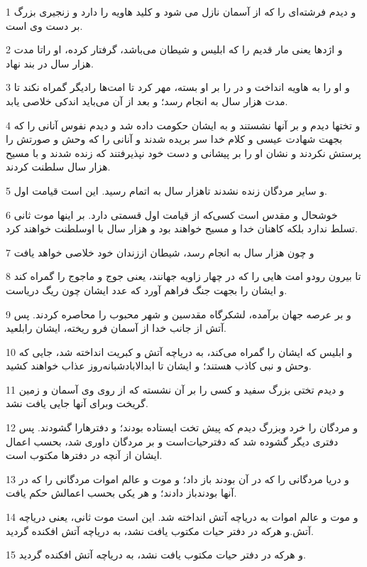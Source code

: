 \par 1 و دیدم فرشته‌ای را که از آسمان نازل می شود و کلید هاویه را دارد و زنجیری بزرگ بر دست وی است.
\par 2 و اژدها یعنی مار قدیم را که ابلیس و شیطان می‌باشد، گرفتار کرده، او راتا مدت هزار سال در بند نهاد.
\par 3 و او را به هاویه انداخت و در را بر او بسته، مهر کرد تا امت‌ها رادیگر گمراه نکند تا مدت هزار سال به انجام رسد؛ و بعد از آن می‌باید اندکی خلاصی یابد.
\par 4 و تختها دیدم و بر آنها نشستند و به ایشان حکومت داده شد و دیدم نفوس آنانی را که بجهت شهادت عیسی و کلام خدا سر بریده شدند و آنانی را که وحش و صورتش را پرستش نکردند و نشان او را بر پیشانی و دست خود نپذیرفتند که زنده شدند و با مسیح هزار سال سلطنت کردند.
\par 5 و سایر مردگان زنده نشدند تاهزار سال به اتمام رسید. این است قیامت اول.
\par 6 خوشحال و مقدس است کسی‌که از قیامت اول قسمتی دارد. بر اینها موت ثانی تسلط ندارد بلکه کاهنان خدا و مسیح خواهند بود و هزار سال با اوسلطنت خواهند کرد.
\par 7 و چون هزار سال به انجام رسد، شیطان اززندان خود خلاصی خواهد یافت
\par 8 تا بیرون رودو امت هایی را که در چهار زاویه جهانند، یعنی جوج و ماجوج را گمراه کند و ایشان را بجهت جنگ فراهم آورد که عدد ایشان چون ریگ دریاست.
\par 9 و بر عرصه جهان برآمده، لشکرگاه مقدسین و شهر محبوب را محاصره کردند. پس آتش از جانب خدا از آسمان فرو ریخته، ایشان رابلعید.
\par 10 و ابلیس که ایشان را گمراه می‌کند، به دریاچه آتش و کبریت انداخته شد، جایی که وحش و نبی کاذب هستند؛ و ایشان تا ابدالابادشبانه‌روز عذاب خواهند کشید.
\par 11 و دیدم تختی بزرگ سفید و کسی را بر آن نشسته که از روی وی آسمان و زمین گریخت وبرای آنها جایی یافت نشد.
\par 12 و مردگان را خرد وبزرگ دیدم که پیش تخت ایستاده بودند؛ و دفترهارا گشودند. پس دفتری دیگر گشوده شد که دفترحیات‌است و بر مردگان داوری شد، بحسب اعمال ایشان از آنچه در دفترها مکتوب است.
\par 13 و دریا مردگانی را که در آن بودند باز داد؛ و موت و عالم اموات مردگانی را که در آنها بودندباز دادند؛ و هر یکی بحسب اعمالش حکم یافت.
\par 14 و موت و عالم اموات به دریاچه آتش انداخته شد. این است موت ثانی، یعنی دریاچه آتش.و هر‌که در دفتر حیات مکتوب یافت نشد، به دریاچه آتش افکنده گردید.
\par 15 و هر‌که در دفتر حیات مکتوب یافت نشد، به دریاچه آتش افکنده گردید.

